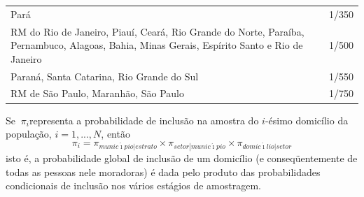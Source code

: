 \documentclass[]{book}
\theoremstyle{definition}
\theoremstyle{definition}
\theoremstyle{definition}
\theoremstyle{remark}
\begin{document}
\begin{longtable}[]{@{}lc@{}}
\begin{minipage}[t]{0.75\columnwidth}
Pará\strut
\end{minipage} & \begin{minipage}[t]{0.19\columnwidth}\centering\strut
1/350\strut
\end{minipage}\tabularnewline
\begin{minipage}[t]{0.75\columnwidth}\raggedright\strut
RM do Rio de Janeiro, Piauí, Ceará, Rio Grande do Norte, Paraíba,
Pernambuco, Alagoas, Bahia, Minas Gerais, Espírito Santo e Rio de
Janeiro\strut
\end{minipage} & \begin{minipage}[t]{0.19\columnwidth}\centering\strut
1/500\strut
\end{minipage}\tabularnewline
\begin{minipage}[t]{0.75\columnwidth}\raggedright\strut
Paraná, Santa Catarina, Rio Grande do Sul\strut
\end{minipage} & \begin{minipage}[t]{0.19\columnwidth}\centering\strut
1/550\strut
\end{minipage}\tabularnewline
\begin{minipage}[t]{0.75\columnwidth}\raggedright\strut
RM de São Paulo, Maranhão, São Paulo\strut
\end{minipage} & \begin{minipage}[t]{0.19\columnwidth}\centering\strut
1/750\strut
\end{minipage}\tabularnewline
\bottomrule
\end{longtable}

Se \({\ \pi }_{i}\)representa a probabilidade de inclusão na amostra do
\(i\)-ésimo domicílio da população, \(i=1,...,N\), então \[
\pi _{i}=\pi _{munic\acute{\imath}pio\left| estrato\right. }\times \pi
_{setor\left| munic\acute{\imath}pio\right. }\times \pi _{domic\acute{\imath}
lio\left| setor\right. } 
\] isto é, a probabilidade global de inclusão de um domicílio (e
conseqüentemente de todas as pessoas nele moradoras) é dada pelo produto
das probabilidades condicionais de inclusão nos vários estágios de
amostragem.
\end{document}
